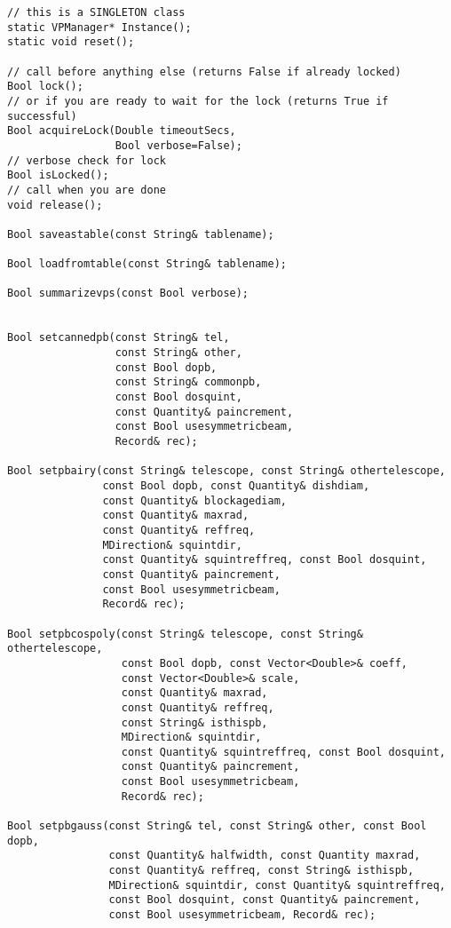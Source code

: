 \documentclass[12pt]{article}
\begin{document}
{\small
\begin{verbatim}
// this is a SINGLETON class
static VPManager* Instance();
static void reset();
 
// call before anything else (returns False if already locked)
Bool lock();
// or if you are ready to wait for the lock (returns True if successful)
Bool acquireLock(Double timeoutSecs, 
                 Bool verbose=False);
// verbose check for lock
Bool isLocked();
// call when you are done
void release();
     
Bool saveastable(const String& tablename);

Bool loadfromtable(const String& tablename);

Bool summarizevps(const Bool verbose);


Bool setcannedpb(const String& tel, 
                 const String& other, 
                 const Bool dopb,
                 const String& commonpb,
                 const Bool dosquint, 
                 const Quantity& paincrement, 
                 const Bool usesymmetricbeam,
                 Record& rec);

Bool setpbairy(const String& telescope, const String& othertelescope, 
               const Bool dopb, const Quantity& dishdiam, 
               const Quantity& blockagediam, 
               const Quantity& maxrad, 
               const Quantity& reffreq, 
               MDirection& squintdir, 
               const Quantity& squintreffreq, const Bool dosquint, 
               const Quantity& paincrement, 
               const Bool usesymmetricbeam,
               Record& rec);

Bool setpbcospoly(const String& telescope, const String& othertelescope,
                  const Bool dopb, const Vector<Double>& coeff,
                  const Vector<Double>& scale,
                  const Quantity& maxrad,
                  const Quantity& reffreq,
                  const String& isthispb,
                  MDirection& squintdir,
                  const Quantity& squintreffreq, const Bool dosquint,
                  const Quantity& paincrement,
                  const Bool usesymmetricbeam,
                  Record& rec);

Bool setpbgauss(const String& tel, const String& other, const Bool dopb,
                const Quantity& halfwidth, const Quantity maxrad, 
                const Quantity& reffreq, const String& isthispb, 
                MDirection& squintdir, const Quantity& squintreffreq,
                const Bool dosquint, const Quantity& paincrement, 
                const Bool usesymmetricbeam, Record& rec);


\end{verbatim}}
\end{document}
